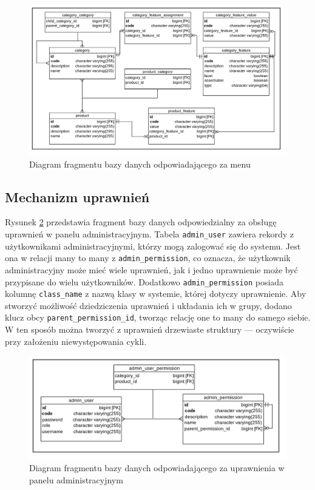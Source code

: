 \begin{figure}
	\begin{center}
		\includegraphics[scale=0.3]{db_sysKlas.png}
	\end{center}
	\caption{{\color{black}Diagram fragmentu bazy danych odpowiadającego za menu}} \label{db_sysKlas}
\end{figure}

\subsection{Mechanizm uprawnień}
Rysunek \ref{db_uprawnienia} przedstawia fragment bazy danych odpowiedzialny za obsługę uprawnień w panelu administracyjnym. Tabela \texttt{admin\_user} zawiera rekordy z użytkownikami administracyjnymi, którzy mogą zalogować się do systemu. Jest ona w relacji many to many z \texttt{admin\_permission}, co oznacza, że użytkownik administracyjny może mieć wiele uprawnień, jak i jedno uprawnienie może być przypisane do wielu użytkowników. Dodatkowo \texttt{admin\_permission} posiada kolumnę \texttt{class\_name} z nazwą klasy w systemie, której dotyczy uprawnienie. Aby stworzyć możliwość dziedziczenia uprawnień i układania ich w grupy, dodano klucz obcy \texttt{parent\_permission\_id}, tworząc relację one to many do samego siebie. W ten sposób można tworzyć z uprawnień drzewiaste struktury — oczywiście przy założeniu niewystępowania cykli. 

\begin{figure}
	\begin{center}
		\includegraphics[scale=0.3]{db_uprawnienia.png}
	\end{center}
	\caption{{\color{black}Diagram fragmentu bazy danych odpowiadającego za uprawnienia w panelu administracyjnym}} \label{db_uprawnienia}
\end{figure}

